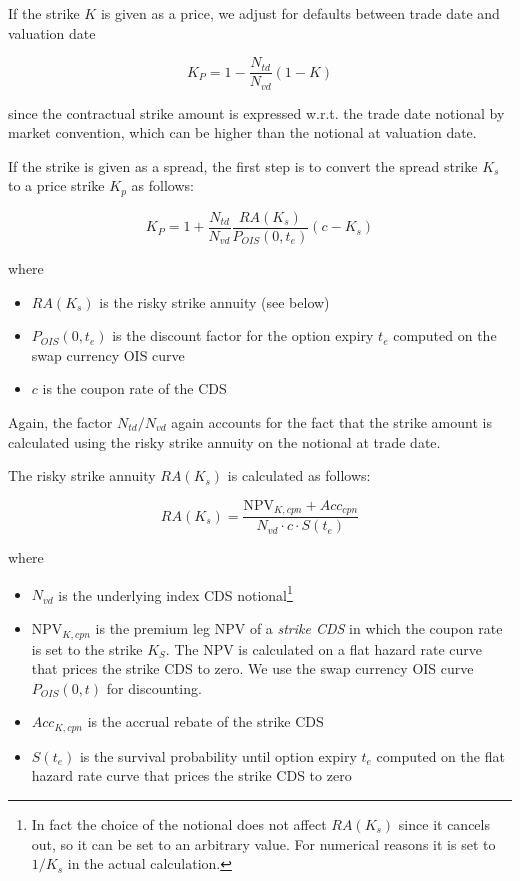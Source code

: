 If the strike $K$ is given as a price, we adjust for defaults between trade date and valuation date

\begin{equation}
K_P = 1 - \frac{N_{td}}{N_{vd}} \left( 1 - K \right)
\end{equation}

since the contractual strike amount is expressed w.r.t. the trade date notional by market convention, which can be
higher than the notional at valuation date.

If the strike is given as a spread, the first step is to convert the spread strike $K_s$ to a price strike $K_p$ as
follows:

\begin{equation}
K_P = 1 + \frac{N_{td}}{N_{vd}}\frac{RA(K_s)}{P_{OIS}(0,t_e)} (c - K_s)
\end{equation}

where

\begin{itemize}
\item $RA(K_s)$ is the risky strike annuity (see below)
\item $P_{OIS}(0,t_e)$ is the discount factor for the option expiry $t_e$ computed on the swap currency OIS curve
\item $c$ is the coupon rate of the CDS
\end{itemize}

Again, the factor $N_{td} / N_{vd}$ again accounts for the fact that the strike amount is calculated using the risky
strike annuity on the notional at trade date. 

The risky strike annuity $RA(K_s)$ is calculated as follows:

\begin{equation}\label{pricing:cr_indexcdsoption_strike_annuity}
RA(K_s) = \frac{\text{NPV}_{K,cpn} + Acc_{cpn}}{N_{vd} \cdot c \cdot S(t_e)}
\end{equation}

where

\begin{itemize}
\item $N_{vd}$ is the underlying index CDS notional\footnote{In fact the choice of the notional does not affect
$RA(K_s)$ since it cancels out, so it can be set to an arbitrary value. For numerical reasons it is set to $1/K_s$ in
the actual calculation.}
\item $\text{NPV}_{K,cpn}$ is the premium leg NPV of a {\em strike CDS} in which the coupon rate is set to the strike
  $K_S$. The NPV is calculated on a flat hazard rate curve that prices the strike CDS to zero. We use the swap currency
  OIS curve $P_{OIS}(0,t)$ for discounting.
\item $Acc_{K,cpn}$ is the accrual rebate of the strike CDS
\item $S(t_e)$ is the survival probability until option expiry $t_e$ computed on the flat hazard rate curve that prices
  the strike CDS to zero
\end{itemize}

